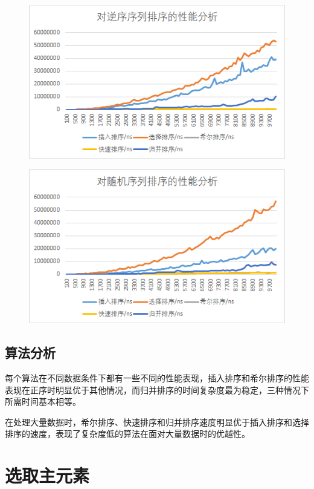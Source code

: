 \documentclass[UTF8]{ctexart}
\begin{document}
        \begin{figure}[H]
          \includegraphics[width=\textwidth]{rev}
          \centering
        \end{figure}
        \begin{figure}[H]
          \includegraphics[width=\textwidth]{random}
          \centering
        \end{figure}
    \subsection{算法分析}
      每个算法在不同数据条件下都有一些不同的性能表现，插入排序和希尔排序的性能表现在正序时明显优于其他情况，而归并排序的时间复杂度最为稳定，三种情况下所需时间基本相等。

      在处理大量数据时，希尔排序、快速排序和归并排序速度明显优于插入排序和选择排序的速度，表现了复杂度低的算法在面对大量数据时的优越性。
  \section{选取主元素}
\end{document}
